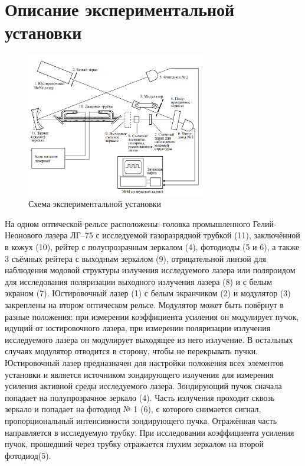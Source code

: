 \section*{Описание экспериментальной установки}

\begin{figure}[H]
	\centering
	\includegraphics[width=0.7\textwidth]{../Изображения/Схема установки.png}
	\caption{Схема экспериментальной установки}
\end{figure}

На одном оптической рельсе расположены: головка промышленного Гелий-Неонового лазера ЛГ–75 с исследуемой газоразрядной трубкой (11), заключённой в кожух (10), рейтер с полупрозрачным зеркалом (4), фотодиоды (5 и 6), а также 3 съёмных рейтера с выходным зеркалом (9), отрицательной линзой для наблюдения модовой структуры излучения исследуемого лазера или поляроидом для исследования поляризации выходного излучения лазера (8) и с белым экраном (7). Юстировочный лазер (1) с белым экранчиком (2) и модулятор (3) закреплены на втором оптическом рельсе. Модулятор может быть повёрнут в разные положения: при измерении коэффициента усиления он модулирует пучок, идущий от юстировочного лазера, при измерении поляризации излучения исследуемого лазера он модулирует выходящее из него излучение. В остальных случаях модулятор отводится в сторону, чтобы не перекрывать пучки. Юстировочный лазер предназначен для настройки положения всех элементов установки и является источником зондирующего излучения для измерения усиления активной среды исследуемого лазера. Зондирующий пучок сначала попадает на полупрозрачное зеркало (4). Часть излучения проходит сквозь зеркало и попадает на фотодиод № 1 (6), с которого снимается сигнал, пропорциональный интенсивности зондирующего пучка. Отражённая часть направляется в исследуемую трубку. При исследовании коэффициента усиления пучок, прошедший через трубку отражается глухим зеркалом на второй фотодиод(5).